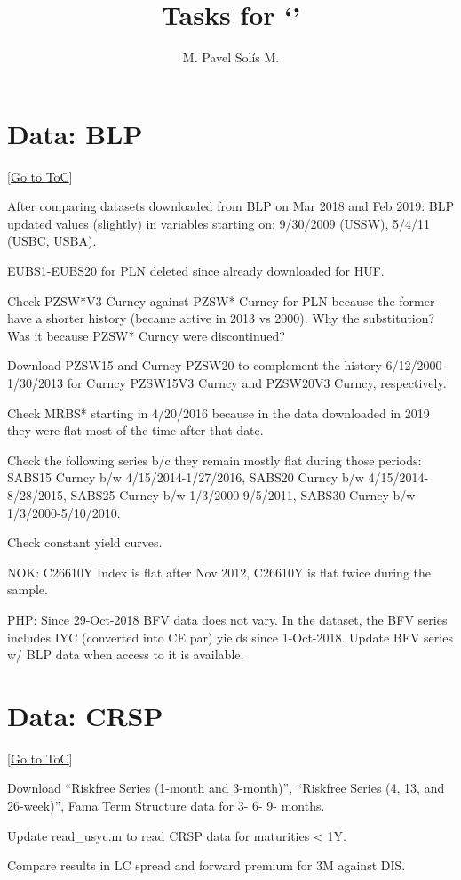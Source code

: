 \documentclass[12pt]{article}
\newcommand{\gototoc}{\vspace{-1.8cm} \null\hfill [\hyperlink{toc}{Go to ToC}] \newline}
\begin{document}
	\title{Tasks for `'}
	\author{M. Pavel Solís M.}
	\date{}
	\maketitle
	\hypertarget{toc}{}								 %
	\tableofcontents
	\vspace{2.5\bigskipamount}
	

\section{Data: BLP}
\gototoc
\begin{todolist}
	\item After comparing datasets downloaded from BLP on Mar 2018 and Feb 2019: BLP updated values (slightly) in variables starting on: 9/30/2009 (USSW), 5/4/11 (USBC, USBA).
	\item EUBS1-EUBS20 for PLN deleted since already downloaded for HUF.
	\item Check PZSW*V3 Curncy against PZSW* Curncy for PLN because the former have a shorter history (became active in 2013 vs 2000). Why the substitution? Was it because PZSW* Curncy were discontinued?
	\item Download PZSW15 and Curncy PZSW20 to complement the history 6/12/2000-1/30/2013 for Curncy PZSW15V3 Curncy and PZSW20V3 Curncy, respectively.
	\item Check MRBS* starting in 4/20/2016 because in the data downloaded in 2019 they were flat most of the time after that date.
	\item Check the following series b/c they remain mostly flat during those periods: SABS15 Curncy b/w 4/15/2014-1/27/2016, SABS20 Curncy b/w 4/15/2014-8/28/2015, SABS25 Curncy b/w 1/3/2000-9/5/2011, SABS30 Curncy b/w 1/3/2000-5/10/2010.
	\item Check constant yield curves.
	\begin{todolist}
		\item NOK: C26610Y Index is flat after Nov 2012, C26610Y is flat twice during the sample.
		\item PHP: Since 29-Oct-2018 BFV data does not vary. In the dataset, the BFV series includes IYC (converted into CE par) yields since 1-Oct-2018. Update BFV series w/ BLP data when access to it is available.
	\end{todolist}
\end{todolist}

\section{Data: CRSP}
\gototoc
\begin{todolist}
	\item Download “Riskfree Series (1-month and 3-month)”, “Riskfree Series (4, 13, and 26-week)”, Fama Term Structure data for 3- 6- 9- months.
	\item Update read_usyc.m to read CRSP data for maturities < 1Y.
	\item Compare results in LC spread and forward premium for 3M against DIS.
\end{todolist}
\end{document}
